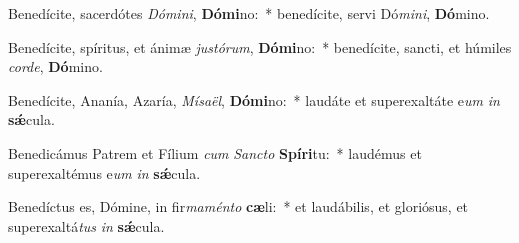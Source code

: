 \item Benedícite, sacerdótes \textit{Dó}\textit{mi}\textit{ni}, \textbf{Dó}\textbf{mi}no:~* benedícite, servi Dó\textit{mi}\textit{ni}, \textbf{Dó}mino.
\item Benedícite, spíritus, et ánimæ \textit{jus}\textit{tó}\textit{rum}, \textbf{Dó}\textbf{mi}no:~* benedícite, sancti, et húmiles \textit{cor}\textit{de}, \textbf{Dó}mino.
\item Benedícite, Ananía, Azaría, \textit{Mí}\textit{sa}\textit{ël}, \textbf{Dó}\textbf{mi}no:~* laudáte et superexaltáte e\textit{um} \textit{in} \textbf{sǽ}cula.
\item Benedicámus Patrem et Fílium \textit{cum} \textit{Sanc}\textit{to} \textbf{Spí}\textbf{ri}tu:~* laudémus et superexaltémus e\textit{um} \textit{in} \textbf{sǽ}cula.
\item Benedíctus es, Dómine, in fir\textit{ma}\textit{mén}\textit{to} \textbf{cæ}li:~* et laudábilis, et gloriósus, et superexaltá\textit{tus} \textit{in} \textbf{sǽ}cula.
